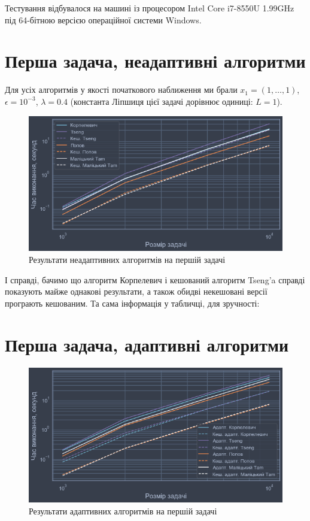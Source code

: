 Тестування відбувалося на машині із процесором Intel Core i7-8550U 1.99GHz під 64-бітною версією операційної системи Windows.

\section{Перша задача, неадаптивні алгоритми}

Для усіх алгоритмів у якості початкового наближення ми брали $x_1 = (1, \dots, 1)$, $\epsilon = 10^{-3}$, $\lambda = 0.4$ (константа Ліпшиця цієї задачі дорівнює одиниці: $L = 1$). 

\begin{figure}[H]
    \centering
    \includegraphics[width=\textwidth]{img/1/time.png}
    \caption{Результати неадаптивних алгоритмів на першій задачі}
\end{figure}

І справді, бачимо що алгоритм Корпелевич і кешований алгоритм Tseng'a справді показують майже однакові результати, а також обидві некешовані версії програють кешованим. Та сама інформація у табличці, для зручності:





\section{Перша задача, адаптивні алгоритми}

\begin{figure}[H]
    \centering
    \includegraphics[width=\textwidth]{img/1/adapt/time.png}
    \caption{Результати адаптивних алгоритмів на першій задачі}
\end{figure}

